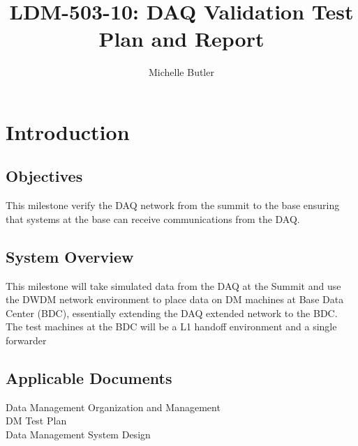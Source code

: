 \documentclass[DM,lsstdraft,STR,toc]{lsstdoc}
\begin{document}
\def\milestoneName{DAQ Validation}
\def\milestoneId{LDM-503-10}
\def\product{Data Management}


\title{LDM-503-10: DAQ Validation Test Plan and Report}
\setDocRef{\lsstDocType-\lsstDocNum}
\date{\vcsdate}
\author{ Michelle Butler }






\maketitle

\section{Introduction}
\label{sect:intro}


\subsection{Objectives}
\label{sect:objectives}

This milestone verify the DAQ network from the summit to the base
ensuring that systems at the base can receive communications from the
DAQ.~~



\subsection{System Overview}
\label{sect:systemoverview}

This milestone will take simulated data from the DAQ at the Summit and
use the DWDM network environment to place data on DM machines at Base
Data Center (BDC), essentially extending the DAQ extended network to the
BDC. The test machines at the BDC will be a L1 handoff environment and a
single forwarder\\[2\baselineskip]

\subsection{Applicable Documents}\label{applicable-documents}

 Data Management Organization and Management\\
 DM Test Plan\\
 Data Management System Design
\end{document}
